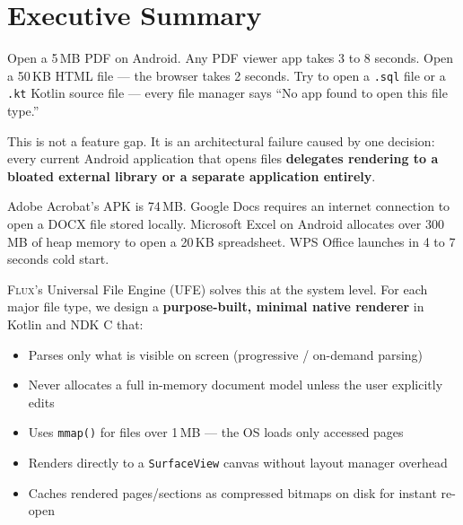 \documentclass[11pt, a4paper, openright]{report}
\newcommand{\flux}{\textsc{Flux}}
\begin{document}
\chapter*{Executive Summary}

Open a 5\,MB PDF on Android. Any PDF viewer app takes 3 to 8 seconds. Open a 50\,KB HTML file --- the browser takes 2 seconds. Try to open a \texttt{.sql} file or a \texttt{.kt} Kotlin source file --- every file manager says ``No app found to open this file type.''

This is not a feature gap. It is an architectural failure caused by one decision: every current Android application that opens files \textbf{delegates rendering to a bloated external library or a separate application entirely}.

Adobe Acrobat's APK is 74\,MB. Google Docs requires an internet connection to open a DOCX file stored locally. Microsoft Excel on Android allocates over 300\,MB of heap memory to open a 20\,KB spreadsheet. WPS Office launches in 4 to 7 seconds cold start.

\flux{}'s Universal File Engine (UFE) solves this at the system level. For each major file type, we design a \textbf{purpose-built, minimal native renderer} in Kotlin and NDK C that:
\begin{itemize}
  \item Parses only what is visible on screen (progressive / on-demand parsing)
  \item Never allocates a full in-memory document model unless the user explicitly edits
  \item Uses \texttt{mmap()} for files over 1\,MB --- the OS loads only accessed pages
  \item Renders directly to a \texttt{SurfaceView} canvas without layout manager overhead
  \item Caches rendered pages/sections as compressed bitmaps on disk for instant re-open
\end{itemize}
\end{document}
